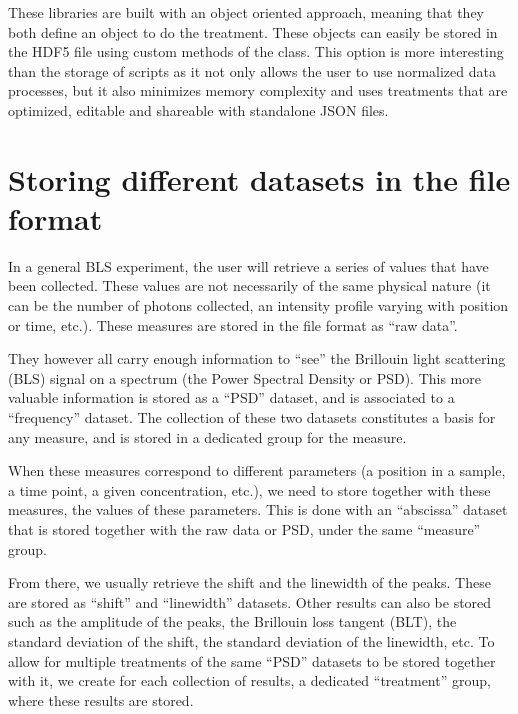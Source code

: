 \documentclass[letterpaper,10pt,english]{sphinxmanual}
\begin{document}
\sphinxAtStartPar
These libraries are built with an object oriented approach, meaning that they both define an object to do the treatment. These objects can easily be stored in the HDF5 file using custom methods of the  class. This option is more interesting than the storage of scripts as it not only allows the user to use normalized data processes, but it also minimizes memory complexity and uses treatments that are optimized, editable and shareable with standalone JSON files.


\section{Storing different datasets in the file format}
\label{\detokenize{source/project_nutshell:storing-different-datasets-in-the-file-format}}
\sphinxAtStartPar
In a general BLS experiment, the user will retrieve a series of values that have been collected. These values are not necessarily of the same physical nature (it can be the number of photons collected, an intensity profile varying with position or time, etc.). These measures are stored in the file format as “raw data”.

\sphinxAtStartPar
They however all carry enough information to “see” the Brillouin light scattering (BLS) signal on a spectrum (the Power Spectral Density or PSD). This more valuable information is stored as a “PSD” dataset, and is associated to a “frequency” dataset. The collection of these two datasets constitutes a basis for any measure, and is stored in a dedicated group for the measure.

\sphinxAtStartPar
When these measures correspond to different parameters (a position in a sample, a time point, a given concentration, etc.), we need to store together with these measures, the values of these parameters. This is done with an “abscissa” dataset that is stored together with the raw data or PSD, under the same “measure” group.

\sphinxAtStartPar
From there, we usually retrieve the shift and the linewidth of the peaks. These are stored as “shift” and “linewidth” datasets. Other results can also be stored such as the amplitude of the peaks, the Brillouin loss tangent (BLT), the standard deviation of the shift, the standard deviation of the linewidth, etc. To allow for multiple treatments of the same “PSD” datasets to be stored together with it, we create for each collection of results, a dedicated “treatment” group, where these results are stored.
\end{document}
